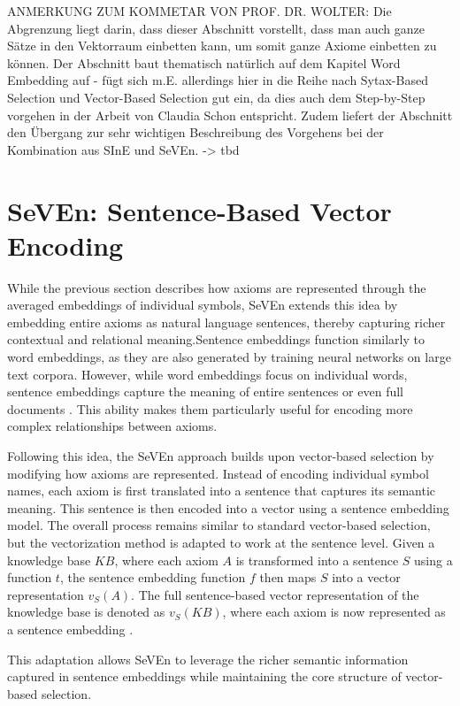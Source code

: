 \documentclass[english,version-2020-11]{uzl-thesis}
\begin{document}
ANMERKUNG ZUM KOMMETAR VON PROF. DR. WOLTER:  
Die Abgrenzung liegt darin, dass dieser Abschnitt vorstellt, dass man auch ganze Sätze in den Vektorraum einbetten kann, um somit ganze Axiome einbetten zu können. Der Abschnitt baut thematisch natürlich auf dem Kapitel Word Embedding auf - fügt sich m.E. allerdings hier in die Reihe nach Sytax-Based Selection und Vector-Based Selection gut ein, da dies auch dem Step-by-Step vorgehen in der Arbeit von Claudia Schon entspricht. Zudem liefert der Abschnitt den Übergang zur sehr wichtigen Beschreibung des Vorgehens bei der Kombination aus SInE und SeVEn.  
-> tbd  

\section{SeVEn: Sentence-Based Vector Encoding}

While the previous section describes how axioms are represented through the averaged embeddings of individual symbols, SeVEn extends this idea by embedding entire axioms as natural language sentences, thereby capturing richer contextual and relational meaning.Sentence embeddings function similarly to word embeddings, as they are also generated by training neural networks on large text corpora. However, while word embeddings focus on individual words, sentence embeddings capture the meaning of entire sentences or even full documents \cite{Kiros2015SkipThought}. This ability makes them particularly useful for encoding more complex relationships between axioms.

Following this idea, the SeVEn approach builds upon vector-based selection by modifying how axioms are represented. Instead of encoding individual symbol names, each axiom is first translated into a sentence that captures its semantic meaning. This sentence is then encoded into a vector using a sentence embedding model. The overall process remains similar to standard vector-based selection, but the vectorization method is adapted to work at the sentence level. Given a knowledge base \( KB \), where each axiom \( A \) is transformed into a sentence \( S \) using a function \( t \), the sentence embedding function \( f \) then maps \( S \) into a vector representation \( v_S(A) \). The full sentence-based vector representation of the knowledge base is denoted as \( v_S(KB) \), where each axiom is now represented as a sentence embedding \cite{Schon2023}.

This adaptation allows SeVEn to leverage the richer semantic information captured in sentence embeddings while maintaining the core structure of vector-based selection.
\end{document}
